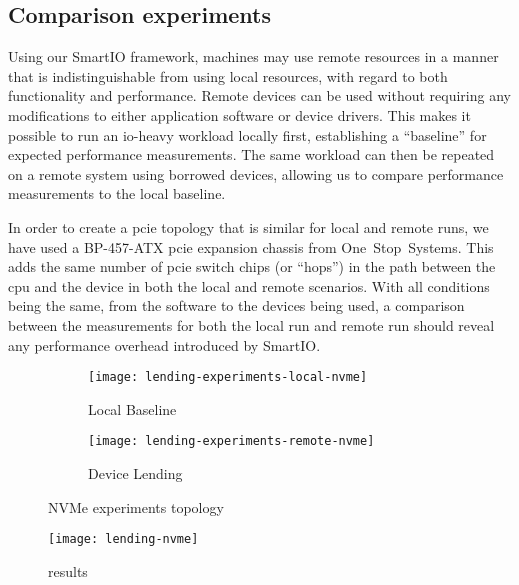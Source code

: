 \subsection{Comparison experiments}
Using our SmartIO framework, machines may use remote resources in a manner that is indistinguishable from using local resources, with regard to both functionality and performance.
%
Remote devices can be used without requiring any modifications to either application software or device drivers.
%
This makes it possible to run an \gls{io}-heavy workload locally first, establishing a ``baseline'' for expected performance measurements.
%
The same workload can then be repeated on a remote system using borrowed devices, allowing us to compare performance measurements to the local baseline.



In order to create a \gls{pcie} topology that is similar for local and remote runs, we have used a BP-457-ATX \gls{pcie} expansion chassis from One~Stop~Systems. 
%
This adds the same number of \gls{pcie} switch chips (or ``hops'') in the path between the \gls{cpu} and the device in both the local and remote scenarios.
%
With all conditions being the same, from the software to the devices being used, a comparison between the measurements for both the local run and remote run should reveal any performance overhead introduced by SmartIO.




\begin{figure}
    \centering
    \begin{subfigure}{\linewidth}
        \centering
        \texttt{[image: lending-experiments-local-nvme]}
        \caption{Local Baseline}
    \end{subfigure}
    \par\vspace{5mm}
    \begin{subfigure}{\linewidth}
        \centering
        \texttt{[image: lending-experiments-remote-nvme]}
        \caption{Device Lending}
    \end{subfigure}
    \caption{NVMe experiments topology}
\end{figure}

\begin{figure}
    \centering
    \texttt{[image: lending-nvme]}
    \caption{results}
\end{figure}


